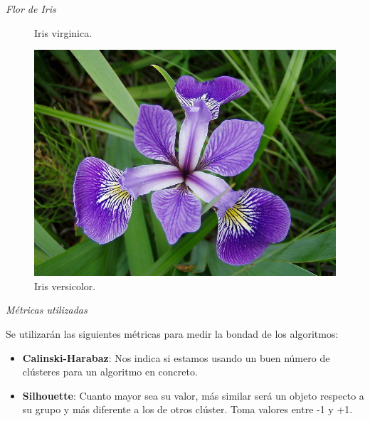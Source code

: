 \documentclass[spanish]{beamer}
\begin{document}
\begin{frame}{\textit{Flor de Iris}}
\begin{figure}[h]
\begin{minipage}[h]{0.28\textwidth}
    \caption{Iris virginica.}
  \end{minipage}
  \hfill
  \begin{minipage}[h]{0.29\textwidth}
    \includegraphics[width=\textwidth]{dani/versicolor.jpg}
    \caption{Iris versicolor.}
  \end{minipage}
\end{figure}
\end{frame}

\begin{frame}{\textit{Métricas utilizadas}}

Se utilizarán las siguientes métricas para medir la bondad de los algoritmos:\break
\begin{itemize}
\item \textbf{Calinski-Harabaz}: Nos indica si estamos usando un buen número de clústeres para un algoritmo en concreto.\break
\item \textbf{Silhouette}: Cuanto mayor sea su valor, más similar será un objeto respecto a su grupo y más diferente a los de otros clúster. Toma valores entre -1 y +1.
\end{itemize}
\end{frame}
\end{document}
